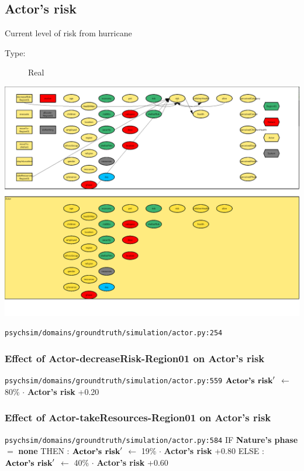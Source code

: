 \documentclass{article}%
\begin{document}
\subsection{Actor's risk}%
\label{subsec:Actor's risk}%
Current level of risk from hurricane%
\begin{description}%
\item[Type:]%
Real%
\end{description}%
\includegraphics[width=\textwidth]{images/riskOfActor.png}%
\begin{flushleft}%
\verb|psychsim/domains/groundtruth/simulation/actor.py:254|%
\end{flushleft}%
\subsubsection{Effect of Actor{-}decreaseRisk{-}Region01 on Actor's risk}%
\label{ssubsec:Effect of Actor{-}decreaseRisk{-}Region01 on Actor's risk}%
\begin{flushleft}%
\verb|psychsim/domains/groundtruth/simulation/actor.py:559|%
\linebreak%
$\mbox{\textbf{Actor's risk}} '$%
$\leftarrow$%
80\%%
$\cdot$%
\textbf{Actor's risk}%
+0.20%
\end{flushleft}

%
\subsubsection{Effect of Actor{-}takeResources{-}Region01 on Actor's risk}%
\label{ssubsec:Effect of Actor{-}takeResources{-}Region01 on Actor's risk}%
\begin{flushleft}%
\verb|psychsim/domains/groundtruth/simulation/actor.py:584|%
\linebreak%
IF %
\textbf{Nature's phase}%
$=$%
\textbf{none}%
\linebreak%
\hspace*{2em}%
THEN %
: %
$\mbox{\textbf{Actor's risk}} '$%
$\leftarrow$%
19\%%
$\cdot$%
\textbf{Actor's risk}%
+0.80%
\linebreak%
\hspace*{2em}%
ELSE %
: %
$\mbox{\textbf{Actor's risk}} '$%
$\leftarrow$%
40\%%
$\cdot$%
\textbf{Actor's risk}%
+0.60%
\end{flushleft}
\end{document}
